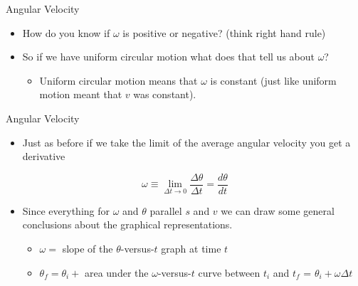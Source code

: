 \documentclass{beamer}
\begin{document}
\begin{frame}{Angular Velocity}
\begin{itemize}
   \item How do you know if $\omega$ is positive or negative? (think right hand rule)
\end{itemize}
\begin{center}
\end{center}
\begin{itemize}
   \item<3-> So if we have uniform circular motion what does that tell us about $\omega$?
   \begin{itemize}
      \item<4-> Uniform circular motion means that $\omega$ is constant (just like uniform motion meant that $v$ was constant).
   \end{itemize}
\end{itemize}
\end{frame}

\begin{frame}{Angular Velocity}
\begin{itemize}
   \item Just as before if we take the limit of the average angular velocity you get a derivative
\end{itemize}
\begin{equation*}
   \omega \equiv \lim\limits_{\Delta t\rightarrow 0} \frac{\Delta\theta}{\Delta t} = \frac{d\theta}{dt}
\end{equation*}
\begin{itemize}
   \item<2-> Since everything for $\omega$ and $\theta$ parallel $s$ and $v$ we can draw some general conclusions about the graphical representations.
   \begin{itemize}
      \item<2-> $\omega = $ slope of the $\theta$-versus-$t$ graph at time $t$
      \item<2-> $\theta_f = \theta_i + $ area under the $\omega$-versus-$t$ curve between $t_i$ and $t_f$ = $\theta_i + \omega\Delta t$
   \end{itemize}
\end{itemize}
\end{frame}
\end{document}
